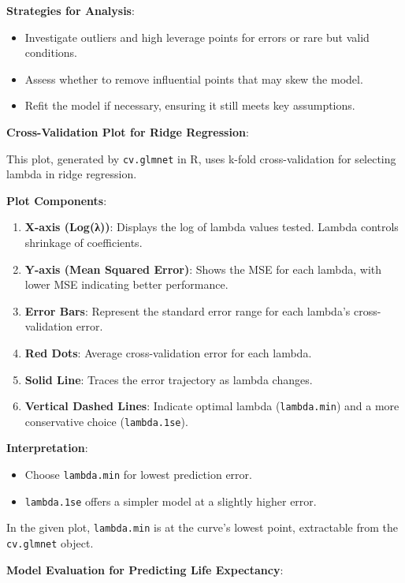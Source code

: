 \documentclass[
]{article}
\begin{document}
\textbf{Strategies for Analysis}:

\begin{itemize}
\item
  Investigate outliers and high leverage points for errors or rare but
  valid conditions.
\item
  Assess whether to remove influential points that may skew the model.
\item
  Refit the model if necessary, ensuring it still meets key assumptions.
\end{itemize}

\textbf{Cross-Validation Plot for Ridge Regression}:

This plot, generated by \texttt{cv.glmnet} in R, uses k-fold
cross-validation for selecting lambda in ridge regression.

\textbf{Plot Components}:

\begin{enumerate}
\def\labelenumi{\arabic{enumi}.}
\item
  \textbf{X-axis (Log(λ))}: Displays the log of lambda values tested.
  Lambda controls shrinkage of coefficients.
\item
  \textbf{Y-axis (Mean Squared Error)}: Shows the MSE for each lambda,
  with lower MSE indicating better performance.
\item
  \textbf{Error Bars}: Represent the standard error range for each
  lambda's cross-validation error.
\item
  \textbf{Red Dots}: Average cross-validation error for each lambda.
\item
  \textbf{Solid Line}: Traces the error trajectory as lambda changes.
\item
  \textbf{Vertical Dashed Lines}: Indicate optimal lambda
  (\texttt{lambda.min}) and a more conservative choice
  (\texttt{lambda.1se}).
\end{enumerate}

\textbf{Interpretation}:

\begin{itemize}
\item
  Choose \texttt{lambda.min} for lowest prediction error.
\item
  \texttt{lambda.1se} offers a simpler model at a slightly higher error.
\end{itemize}

In the given plot, \texttt{lambda.min} is at the curve's lowest point,
extractable from the \texttt{cv.glmnet} object.

\textbf{Model Evaluation for Predicting Life Expectancy}:
\end{document}
